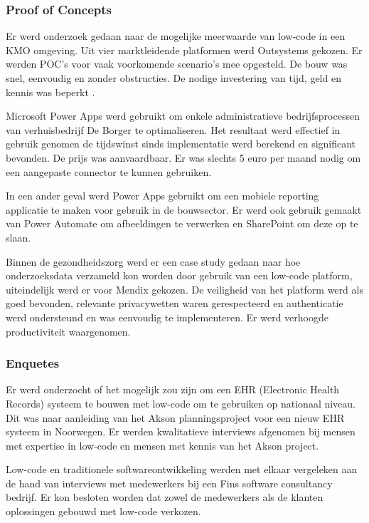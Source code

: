 \subsubsection{Proof of Concepts}

Er werd onderzoek gedaan naar de mogelijke meerwaarde van low-code in een KMO omgeving. Uit vier marktleidende platformen werd Outsystems gekozen. Er werden POC's voor vaak voorkomende scenario's mee opgesteld. De bouw was snel, eenvoudig en zonder obstructies. De nodige investering van tijd, geld en kennis was beperkt \autocite{Devloo2018}.

Microsoft Power Apps werd gebruikt om enkele administratieve bedrijfsprocessen van verhuisbedrijf De Borger te optimaliseren. Het resultaat werd effectief in gebruik genomen de tijdswinst sinds implementatie werd berekend en significant bevonden. De prijs was aanvaardbaar. Er was slechts 5 euro per maand nodig om een aangepaste connector te kunnen gebruiken. \autocite{Spriet2019}

In een ander geval werd Power Apps gebruikt om een mobiele reporting applicatie te maken voor gebruik in de bouwsector. Er werd ook gebruik gemaakt van Power Automate om afbeeldingen te verwerken en SharePoint om deze op te slaan. \autocite{Aho2018}

Binnen de gezondheidszorg werd er een case study gedaan naar hoe onderzoeksdata verzameld kon worden door gebruik van een low-code platform, uiteindelijk werd er voor Mendix gekozen. De veiligheid van het platform werd als goed bevonden, relevante privacywetten waren gerespecteerd en authenticatie werd ondersteund en was eenvoudig te implementeren. Er werd verhoogde productiviteit waargenomen. \autocite{Totterdale2018}

\subsubsection{Enquetes}

Er werd onderzocht of het mogelijk zou zijn om een EHR (Electronic Health Records) systeem te bouwen met low-code om te gebruiken op nationaal niveau. Dit was naar aanleiding van het Akson planningsproject voor een nieuw EHR systeem in Noorwegen. Er werden kwalitatieve interviews afgenomen bij mensen met expertise in low-code en mensen met kennis van het Akson project. \autocite{Ness2019}

Low-code en traditionele softwareontwikkeling werden met elkaar vergeleken aan de hand van interviews met medewerkers bij een Fins software consultancy bedrijf. Er kon besloten worden dat zowel de medewerkers als de klanten oplossingen gebouwd met low-code verkozen. \autocite{Virta2018}

